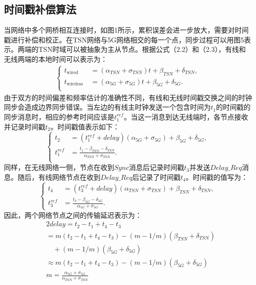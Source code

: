\documentclass[UTF8,a4paper,12pt]{ctexart}
\numberwithin{equation}{section}
\begin{document}
\subsection{时间戳补偿算法}
当网络中多个网桥相互连接时，如图1所示，累积误差会进一步放大，需要对时间戳进行补偿和校正。在TSN网络与5G网络相交的每一个点，同步过程可以用图5表示。两端的TSN时域可以被抽象为主从节点。根据公式（2.2）和（2.3），有线和无线两端的本地时间可以表示为：
\begin{eqnarray}
	\left\{
	\begin{aligned}
		t_{\text {wired}}&=\left(\alpha_{TSN}+\sigma_{TSN}\right) t+\beta_{TSN}+\delta_{TSN},\\
		t_{\text {wireless }}&=\left(\alpha_{5G}+\sigma_{5G}\right) t+\beta_{5G}+\delta_{5G}.\\
	\end{aligned}
	\right.
\end{eqnarray}
由于双方的时间偏差和频率估计的准确性不同，有线和无线时间戳交换之间的时钟同步会造成边界同步错误。当左边的有线主时钟发送一个包含时间为$t_1$的时间戳的同步消息时，相应的参考时间应该是$t_1^{ref}$。当这一消息到达无线端时，各节点接收并记录时间戳$t_2$。时间戳值表示如下：
\begin{equation}
	\left\{
	\begin{aligned}
		t_{2}&=(t_1^{ref}+delay)(\alpha_{5G}+\sigma_{5G})+\beta_{5G}+\delta_{5G},\\
		t_1^{ref}&=\frac{t_{1}-\beta_{TSN}-\delta_{TSN}}{\alpha_{TSN}+\sigma_{TSN}}.\\
	\end{aligned}
	\right.	
\end{equation}
同样，在无线网络一侧，节点在收到$Sync$消息后记录时间戳$t_3$并发送$Delay\_Req$消息。随后，有线网络节点在收到$Delay\_Req$后记录了时间戳$t_4$。时间戳的值写为：
\begin{equation}
	\left\{
	\begin{aligned}
		t_{4}&=(t_3^{ref}+delay)(\alpha_{TSN}+\sigma_{TSN})+\beta_{TSN}+\delta_{TSN},\\
		t_3^{ref}&=\frac{t_{3}-\beta_{5G}-\delta_{5G}}{\alpha_{5G}+\sigma_{5G}}.
	\end{aligned}
	\right.	
\end{equation}
因此，两个网络节点之间的传输延迟表示为：
\begin{equation}
	\begin{split}
		&2  delay =t_{2}-t_{1}+t_{4}-t_{3} \\
		&=m\left(t_{2}-t_{1}+t_{4}-t_{3}\right)-(m-1 / m)\left(\beta_{TSN}+\delta_{TSN}\right)\\
		&\quad+(m-1 / m)\left(\beta_{5G}+\delta_{5G}\right)\\
		& \approx m\left(t_{2}-t_{1}+t_{4}-t_{3}\right)-(m-1 / m)\left(\beta_{5G}+\delta_{5G}\right)\\
		&m=\frac{\alpha_{5G}+\sigma_{5G}}{\alpha_{TSN}+\sigma_{TSN}}		
	\end{split}
\end{equation}
\end{document}
